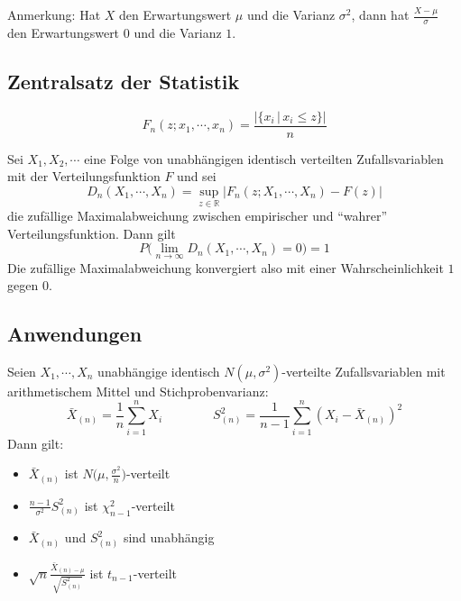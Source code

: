 \documentclass[a4paper, 11pt, accentcolor = tud3b]{tudreport}
\newcommand{\forwhich}{\ensuremath{{\,\vert\,}}}
\newcommand{\abs}[1]{\ensuremath{{\lvert #1 \rvert}}}
\newcommand{\R}{\ensuremath{\mathbb{R}}}
\begin{document}
                Anmerkung: Hat \(X\) den Erwartungswert \(\mu\) und die Varianz \(\sigma^2\), dann hat \( \frac{X - \mu}{\sigma} \) den Erwartungswert \(0\) und die Varianz \(1\).

            \subsection{Zentralsatz der Statistik}
	            \begin{equation*}
		            F_n(z; x_1, \cdots, x_n) = \frac{\abs{\{ x_i \forwhich x_i \leq z \}}}{n}
	            \end{equation*}
            
                Sei \( X_1, X_2, \cdots \) eine Folge von unabhängigen identisch verteilten Zufallsvariablen mit der Verteilungsfunktion \(F\) und sei
                \begin{equation*}
	                D_n(X_1, \cdots, X_n) = \sup_{z \in \R} \abs{F_n(z; X_1, \cdots, X_n) - F(z)}
                \end{equation*}
                die zufällige Maximalabweichung zwischen empirischer und \enquote{wahrer} Verteilungsfunktion. Dann gilt
                \begin{equation*}
	                P\bigg( \lim\limits_{n \rightarrow \infty} D_n(X_1, \cdots, X_n) = 0 \bigg) = 1
                \end{equation*}
                Die zufällige Maximalabweichung konvergiert also mit einer Wahrscheinlichkeit \(1\) gegen \(0\).

            \subsection{Anwendungen}
                Seien \( X_1, \cdots, X_n \) unabhängige identisch \( N(\mu, \sigma^2) \)-verteilte Zufallsvariablen mit arithmetischem Mittel und Stichprobenvarianz:
                \begin{equation*}
	                \bar{X}_{(n)} = \frac{1}{n} \sum_{i = 1}^{n} X_i \qquad\qquad S_{(n)}^2 = \frac{1}{n - 1} \sum_{i = 1}^{n} (X_i - \bar{X}_{(n)})^2
                \end{equation*}
                Dann gilt:
                \begin{itemize}
                	\item \( \bar{X}_{(n)} \) ist \( N\Big(\mu, \frac{\sigma^2}{n}\Big) \)-verteilt
                	\item \( \frac{n - 1}{\sigma^2} S_{(n)}^2 \) ist \( \chi_{n - 1}^2 \)-verteilt
                	\item \( \bar{X}_{(n)} \) und \( S_{(n)}^2 \) sind unabhängig
                	\item \( \sqrt{n} \frac{\bar{X}_{(n) - \mu}}{\sqrt{S_{(n)}^2}} \) ist \( t_{n-1} \)-verteilt
                \end{itemize}
\end{document}
